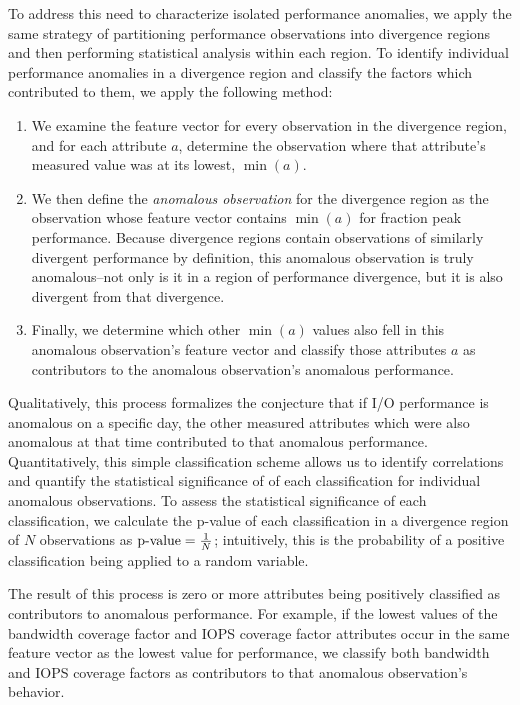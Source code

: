 To address this need to characterize isolated performance anomalies, we apply the same strategy of partitioning performance observations into divergence regions and then performing statistical analysis within each region.
To identify individual performance anomalies in a divergence region and classify the factors which contributed to them, we apply the following method:

\begin{enumerate}[leftmargin=*]

\item We examine the feature vector for every observation in the divergence region, and for each attribute $a$, determine the observation where that attribute's measured value was at its lowest, $\min(a)$.

\item We then define the \emph{anomalous observation} for the divergence region as the observation whose feature vector contains $\min(a)$ for fraction peak performance.
Because divergence regions contain observations of similarly divergent performance by definition, this anomalous observation is truly anomalous--not only is it in a region of performance divergence, but it is also divergent from that divergence.

\item Finally, we determine which other $\min(a)$ values also fell in this anomalous observation's feature vector and classify those attributes $a$ as contributors to the anomalous observation's anomalous performance.

\end{enumerate}

Qualitatively, this process formalizes the conjecture that if I/O performance is anomalous on a specific day, the other measured attributes which were also anomalous at that time contributed to that anomalous performance.
Quantitatively, this simple classification scheme allows us to identify correlations and quantify the statistical significance of of each classification for individual anomalous observations.
To assess the statistical significance of each classification, we calculate the p-value of each classification in a divergence region of $N$ observations as $\textup{p-value} = \frac{1}{N}$; intuitively, this is the probability of a positive classification being applied to a random variable.

The result of this process is zero or more attributes being positively classified as contributors to anomalous performance.
For example, if the lowest values of the bandwidth coverage factor and IOPS coverage factor attributes occur in the same feature vector as the lowest value for performance, we classify both bandwidth and IOPS coverage factors as contributors to that anomalous observation's behavior.

